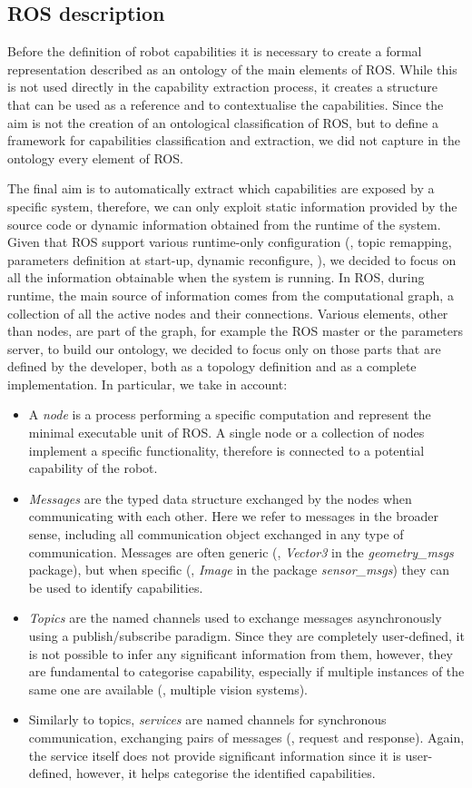 \subsection{ROS description}
Before the definition of robot capabilities it is necessary to create a formal representation described as an ontology of the main elements of ROS. While this is not used directly in the capability extraction process, it creates a structure that can be used as a reference and to contextualise the capabilities. Since the aim is not the creation of an ontological classification of ROS, but to define a framework for capabilities classification and extraction, we did not capture in the ontology every element of ROS. 

The final aim is to automatically extract which capabilities are exposed by a specific system, therefore, we can only exploit static information provided by the source code or dynamic information obtained from the runtime of the system. Given that ROS support various runtime-only configuration (\eg, topic remapping, parameters definition at start-up, dynamic reconfigure, \etc), we decided to focus on all the information obtainable when the system is running. In ROS, during runtime, the main source of information comes from the computational graph, a collection of all the active nodes and their connections. Various elements, other than nodes, are part of the graph, for example the ROS master or the parameters server, to build our ontology, we decided to focus only on those parts that are defined by the developer, both as a topology definition and as a complete implementation. In particular, we take in account:
\begin{itemize}
\item A \textit{node} is a process performing a specific computation and represent the minimal executable unit of ROS. A single node or a collection of nodes implement a specific functionality, therefore is connected to a potential capability of the robot.
\item \textit{Messages} are the typed data structure exchanged by the nodes when communicating with each other. Here we refer to messages in the broader sense, including all communication object exchanged in any type of communication. Messages are often generic (\eg, \textit{Vector3} in the \textit{geometry\_msgs} package), but when specific (\eg, \textit{Image} in the package \textit{sensor\_msgs})  they can be used to identify capabilities.
\item \textit{Topics} are the named channels used to exchange messages asynchronously using a publish/subscribe paradigm. Since they are completely user-defined, it is not possible to infer any significant information from them, however, they are fundamental to categorise capability, especially if multiple instances of the same one are available (\eg, multiple vision systems).
\item Similarly to topics, \textit{services} are named channels for synchronous communication, exchanging pairs of messages (\ie, request and response). Again, the service itself does not provide significant information since it is user-defined, however, it helps categorise the identified capabilities.  
\end{itemize}
